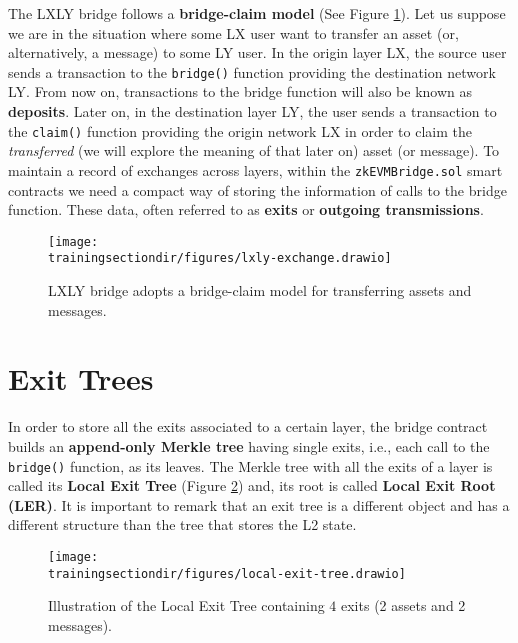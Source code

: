The LXLY bridge follows a \textbf{bridge-claim model} (See Figure \ref{fig:lxly-exchange}). Let us suppose we are in the situation where some LX user want to transfer an asset (or, alternatively, a message) to some LY user. In the origin layer LX, the source user sends a transaction to the \texttt{bridge()} function providing the destination network LY. From now on, transactions to the bridge function will also be known as \textbf{deposits}. Later on, in the destination layer LY, the user sends a transaction to the \texttt{claim()} function providing the origin network LX in order to claim the \textit{transferred} (we will explore the meaning of that later on) asset (or message). To maintain a record of exchanges across layers, within the \texttt{zkEVMBridge.sol} smart contracts we need a compact way of storing the information of calls to the bridge function. These data, often referred to as \textbf{exits} or \textbf{outgoing transmissions}.

\vspace{1em}

\begin{figure}[H]
\centering
\texttt{[image: \\trainingsectiondir/figures/lxly-exchange.drawio]}
\caption{LXLY bridge adopts a bridge-claim model for transferring assets and messages.}
\label{fig:lxly-exchange}
\end{figure}


\section{Exit Trees}

In order to store all the exits associated to a certain layer, the bridge contract builds an \textbf{append-only Merkle tree} having single exits, i.e., each call to the \texttt{bridge()} function, as its leaves. The Merkle tree with all the exits of a layer is called its \textbf{Local Exit Tree} (Figure \ref{fig:local-exit-tree}) and, its root is called \textbf{Local Exit Root (LER)}. It is important to remark that an exit tree is a different object and has a different structure than the tree that stores the L2 state.

\begin{figure}[H]
\centering
\texttt{[image: \\trainingsectiondir/figures/local-exit-tree.drawio]}
\caption{Illustration of the Local Exit Tree containing $4$ exits (2 assets and 2 messages).}
\label{fig:local-exit-tree}
\end{figure}

